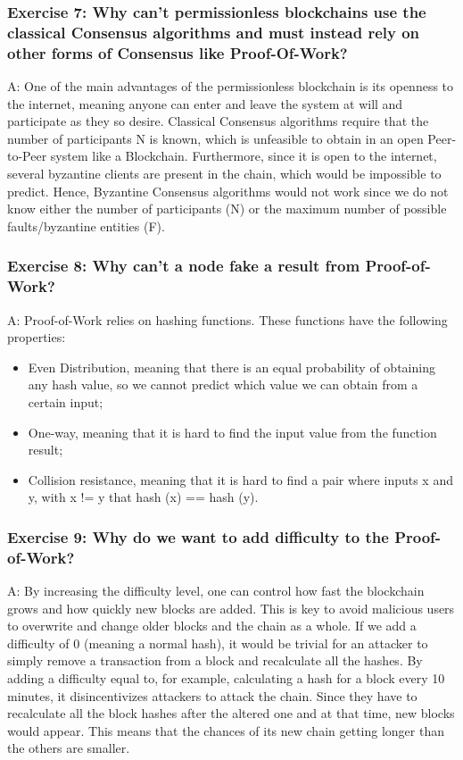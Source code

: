 \documentclass[12pt,a4paper]{article}
\begin{document}

\subsubsection*{Exercise 7: Why can't permissionless blockchains use the classical Consensus algorithms and must instead rely on other forms of Consensus like Proof-Of-Work?}

A: One of the main advantages of the permissionless blockchain is its openness to the internet, meaning anyone can enter and leave the system at will and participate as they so desire. Classical Consensus algorithms require that the number of participants N is known, which is unfeasible to obtain in an open Peer-to-Peer system like a Blockchain. Furthermore, since it is open to the internet, several byzantine clients are present in the chain, which would be impossible to predict. Hence, Byzantine Consensus algorithms would not work since we do not know either the number of participants (N) or the maximum number of possible faults/byzantine entities (F).

\subsubsection*{Exercise 8: Why can't a node fake a result from Proof-of-Work?}

A: Proof-of-Work relies on hashing functions. These functions have the following properties:
\begin{itemize}
\item Even Distribution, meaning that there is an equal probability of obtaining any hash value, so we cannot predict which value we can obtain from a certain input;
\item One-way, meaning that it is hard to find the input value from the function result;
\item Collision resistance, meaning that it is hard to find a pair where inputs x and y, with x != y that hash (x) == hash (y).
\end{itemize}

\subsubsection*{Exercise 9: Why do we want to add difficulty to the Proof-of-Work?}
A: By increasing the difficulty level, one can control how fast the blockchain grows and how quickly new blocks are added. This is key to avoid malicious users to overwrite and change older blocks and the chain as a whole. If we add a difficulty of 0 (meaning a normal hash), it would be trivial for an attacker to simply remove a transaction from a block and recalculate all the hashes. By adding a difficulty equal to, for example, calculating a hash for a block every 10 minutes, it disincentivizes attackers to attack the chain. Since they have to recalculate all the block hashes after the altered one and at that time, new blocks would appear. This means that the chances of its new chain getting longer than the others are smaller.
\end{document}
